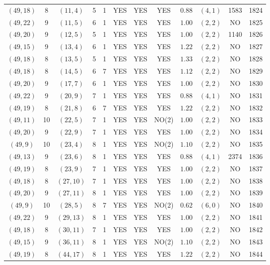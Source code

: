 \begin{longtable}{|c|c|c|c|c|c|c|c|c|c|c|c|}
$(49,18)$ & 8 & $(11,4)$ & 5 & 1 & YES & YES & YES & $0.88$ & $(4,1)$ & 1583 & 1824\\
$(49,22)$ & 9 & $(11,5)$ & 6 & 1 & YES & YES & YES & $1.00$ & $(2,2)$ & NO & 1825\\
$(49,20)$ & 9 & $(12,5)$ & 5 & 1 & YES & YES & YES & $1.00$ & $(2,2)$ & 1140 & 1826\\
$(49,15)$ & 9 & $(13,4)$ & 6 & 1 & YES & YES & YES & $1.22$ & $(2,2)$ & NO & 1827\\
$(49,18)$ & 8 & $(13,5)$ & 5 & 1 & YES & YES & YES & $1.33$ & $(2,2)$ & NO & 1828\\
$(49,18)$ & 8 & $(14,5)$ & 6 & 7 & YES & YES & YES & $1.12$ & $(2,2)$ & NO & 1829\\
$(49,20)$ & 9 & $(17,7)$ & 6 & 1 & YES & YES & YES & $1.00$ & $(2,2)$ & NO & 1830\\
$(49,22)$ & 9 & $(20,9)$ & 7 & 1 & YES & YES & YES & $0.88$ & $(4,1)$ & NO & 1831\\
$(49,19)$ & 8 & $(21,8)$ & 6 & 7 & YES & YES & YES & $1.22$ & $(2,2)$ & NO & 1832\\
$(49,11)$ & 10 & $(22,5)$ & 7 & 1 & YES & YES & NO(2) & $1.00$ & $(2,2)$ & NO & 1833\\
$(49,20)$ & 9 & $(22,9)$ & 7 & 1 & YES & YES & YES & $1.00$ & $(2,2)$ & NO & 1834\\
$(49,9)$ & 10 & $(23,4)$ & 8 & 1 & YES & YES & NO(2) & $1.10$ & $(2,2)$ & NO & 1835\\
$(49,13)$ & 9 & $(23,6)$ & 8 & 1 & YES & YES & YES & $0.88$ & $(4,1)$ & 2374 & 1836\\
$(49,19)$ & 8 & $(23,9)$ & 7 & 1 & YES & YES & YES & $1.00$ & $(2,2)$ & NO & 1837\\
$(49,18)$ & 8 & $(27,10)$ & 7 & 1 & YES & YES & YES & $1.00$ & $(2,2)$ & NO & 1838\\
$(49,20)$ & 9 & $(27,11)$ & 8 & 1 & YES & YES & YES & $1.00$ & $(2,2)$ & NO & 1839\\
$(49,9)$ & 10 & $(28,5)$ & 8 & 7 & YES & YES & NO(2) & $0.62$ & $(6,0)$ & NO & 1840\\
$(49,22)$ & 9 & $(29,13)$ & 8 & 1 & YES & YES & YES & $1.00$ & $(2,2)$ & NO & 1841\\
$(49,18)$ & 8 & $(30,11)$ & 7 & 1 & YES & YES & YES & $1.00$ & $(2,2)$ & NO & 1842\\
$(49,15)$ & 9 & $(36,11)$ & 8 & 1 & YES & YES & NO(2) & $1.10$ & $(2,2)$ & NO & 1843\\
$(49,19)$ & 8 & $(44,17)$ & 8 & 1 & YES & YES & YES & $1.22$ & $(2,2)$ & NO & 1844\\

\end{longtable}
